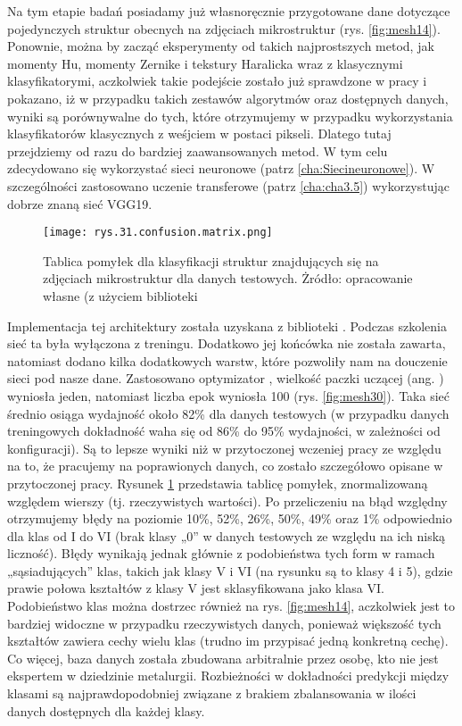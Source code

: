 Na tym etapie badań posiadamy już własnoręcznie przygotowane dane dotyczące pojedynczych struktur obecnych na zdjęciach mikrostruktur (rys. \ref{fig:mesh14}). Ponownie, można by zacząć eksperymenty od takich najprostszych metod, jak momenty Hu, momenty Zernike i tekstury Haralicka wraz z klasycznymi klasyfikatorymi, aczkolwiek takie podejście zostało już sprawdzone w pracy \cite{Reczek21} i pokazano, iż w przypadku takich zestawów algorytmów oraz dostępnych danych, wyniki są porównywalne do tych, które otrzymujemy w przypadku wykorzystania klasyfikatorów klasycznych z weśjciem w postaci pikseli. Dlatego tutaj przejdziemy od razu do bardziej zaawansowanych metod. W tym celu zdecydowano się wykorzystać sieci neuronowe (patrz \ref{cha:Siecineuronowe}). W szczególności zastosowano uczenie transferowe (patrz \ref{cha:cha3.5}) wykorzystując dobrze znaną sieć VGG19. 
\begin{figure}[h]
    \centering
    \texttt{[image: rys.31.confusion.matrix.png]}
    \caption{Tablica pomyłek dla klasyfikacji struktur znajdujących się na zdjęciach mikrostruktur dla danych testowych. Żródło: opracowanie własne (z użyciem biblioteki }
    \label{fig:mesh29}
\end{figure}
Implementacja tej architektury została uzyskana z biblioteki . Podczas szkolenia sieć ta była wyłączona z treningu. Dodatkowo jej końcówka nie została zawarta, natomiast dodano kilka dodatkowych warstw, które pozwoliły nam na douczenie sieci pod nasze dane. Zastosowano optymizator , wielkość paczki uczącej (ang. ) wyniosła jeden, natomiast liczba epok wyniosła 100 (rys. \ref{fig:mesh30}).  Taka sieć średnio osiąga wydajność około 82\% dla danych testowych (w przypadku danych treningowych dokładność waha się od 86\% do 95\% wydajności, w zależności od konfiguracji). Są to lepsze wyniki niż w przytoczonej wczeniej pracy \cite{Reczek21} ze względu na to, że pracujemy na poprawionych danych, co zostało szczegółowo opisane w przytoczonej pracy. Rysunek \ref{fig:mesh29} przedstawia tablicę pomyłek, znormalizowaną względem wierszy (tj. rzeczywistych wartości). 
Po przeliczeniu na błąd względny otrzymujemy błędy na poziomie 10\%, 52\%, 26\%, 50\%, 49\% oraz 1\% odpowiednio dla klas od I do VI (brak klasy „0” w danych testowych ze względu na ich niską liczność). Błędy wynikają jednak głównie z podobieństwa tych form w ramach „sąsiadujących” klas, takich jak klasy V i VI (na rysunku są to klasy 4 i 5), gdzie prawie połowa kształtów z klasy V jest sklasyfikowana jako klasa VI. Podobieństwo klas można dostrzec również na rys. \ref{fig:mesh14}, aczkolwiek jest to bardziej widoczne w przypadku rzeczywistych danych, ponieważ większość tych kształtów zawiera cechy wielu klas (trudno im przypisać jedną konkretną cechę). Co więcej, baza danych została zbudowana arbitralnie przez osobę, kto nie jest ekspertem w dziedzinie metalurgii. Rozbieżności w dokładności predykcji między klasami są najprawdopodobniej związane z brakiem zbalansowania w ilości danych dostępnych dla każdej klasy.
